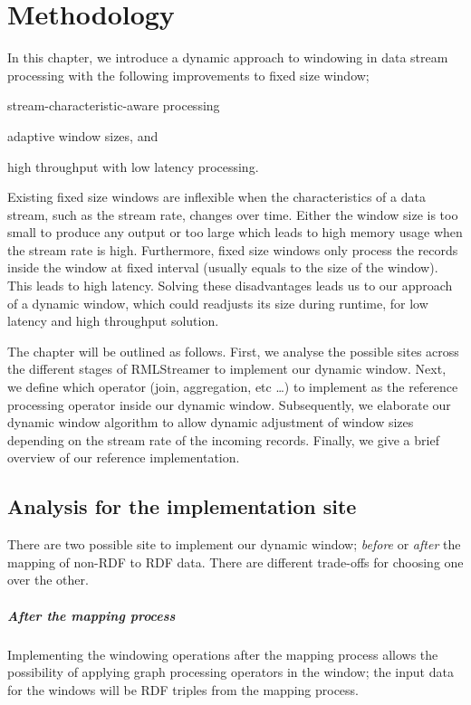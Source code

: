\chapter{Methodology}%
\label{chap:Methodology}


In this chapter, we introduce a dynamic approach to windowing in data stream processing 
with the following improvements to fixed size window; 
\begin{enumerate*}[label=(\alph*)]
    \item stream-characteristic-aware processing 
    \item adaptive window sizes, and 
    \item high throughput with low latency processing. 
\end{enumerate*}

Existing fixed size windows are inflexible when the characteristics of a data stream,  
such as the stream rate, changes over time. Either the window size is 
too small to produce any output or too large which leads to high memory usage when 
the stream rate is high. Furthermore, fixed size windows only process the 
records inside the window at fixed interval (usually equals to the size of the window). 
This leads to high latency. Solving these disadvantages leads us to our approach 
of a dynamic window, which could readjusts its size during runtime,
for low latency and high throughput solution. 


The chapter will be outlined as follows. 
First, we analyse the possible sites across the different stages of 
RMLStreamer to implement our dynamic window. Next, we define which operator
(join, aggregation, etc \dots) to implement as the reference processing operator inside 
our dynamic window. Subsequently, we elaborate our dynamic window algorithm to allow 
dynamic adjustment of window sizes depending on the stream rate of the incoming records.  
Finally, we give a brief overview of our reference implementation.



\section{Analysis for the implementation site}
\label{sec:analysis implementation site}
There are two possible site to implement our dynamic window; 
\emph{before} or \emph{after} the mapping of non-RDF to RDF data. There are different trade-offs for choosing one 
over the other. 

\paragraph{After the mapping process}%
Implementing the windowing operations after the mapping process allows the 
possibility of applying graph processing operators in the window; the input data for 
the windows will be RDF triples from the mapping process. 

